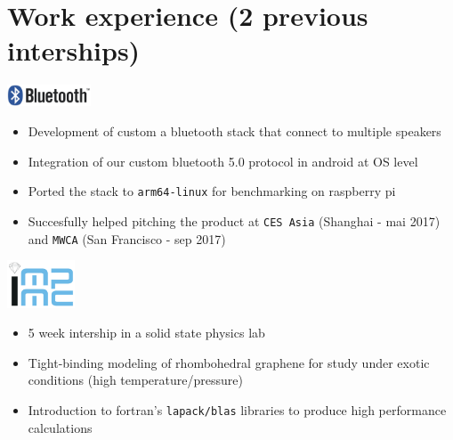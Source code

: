 \section{Work experience (2 previous interships)}

\noindent
\begin{minipage}{.15\textwidth}
\centerline{\includegraphics[width=25mm]{img/bluetooth}}
\end{minipage}%
\hspace{5mm}
\begin{minipage}{.8\textwidth}
\raggedright
    \begin{itemize}
        \item Development of custom a bluetooth stack that connect to multiple speakers
		\item Integration of our custom bluetooth 5.0 protocol in android at OS level
        \item Ported the stack to \texttt{arm64-linux} for benchmarking on raspberry pi
        \item Succesfully helped pitching the product at \texttt{CES Asia} (Shanghai - mai 2017) and \texttt{MWCA} (San Francisco - sep 2017)
    \end{itemize}
\end{minipage}

\noindent
\begin{minipage}{.15\textwidth}
\centerline{\includegraphics[width=20mm]{img/impmc}}
\end{minipage}%
\hspace{5mm}
\begin{minipage}{.8\textwidth}
\raggedright
    \begin{itemize}
        \item 5 week intership in a solid state physics lab
        \item Tight-binding modeling of rhombohedral graphene for study under exotic conditions (high temperature/pressure)
        \item Introduction to fortran's \texttt{lapack/blas} libraries to produce high performance calculations
    \end{itemize}
\end{minipage}
